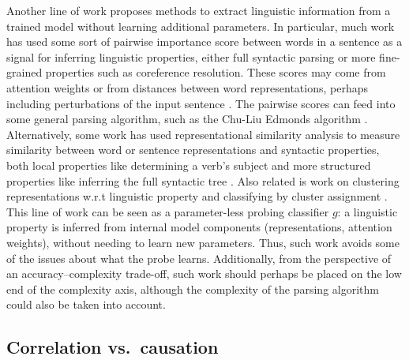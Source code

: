 \documentclass[discussion]{clv3}
\begin{document}
Another line of work proposes methods to extract linguistic information from a trained model without learning additional parameters. In particular, much work has used some sort of pairwise importance score between words in a sentence as a signal for inferring linguistic properties, either full syntactic parsing or more fine-grained properties such as coreference resolution. These scores may come from attention weights \cite{raganato-tiedemann-2018-analysis,clark-etal-2019-bert,marecek-rosa-2019-balustrades,htut2019attention} or from distances between word representations, perhaps including perturbations of the input sentence \cite{wu-etal-2020-perturbed}.   The pairwise scores can feed into some general parsing algorithm, such as the Chu-Liu Edmonds algorithm \citeyearpar{10030090917,edmonds1967optimum}.  Alternatively, some work has used representational similarity analysis \cite{10.3389/neuro.06.004.2008} to measure similarity between word or sentence representations and syntactic properties, both local properties like determining a verb's subject \cite{lepori-mccoy-2020-picking} and more structured properties like inferring the full syntactic tree \cite{chrupala-alishahi-2019-correlating}. Also related is work on clustering representations w.r.t linguistic property and classifying by cluster assignment \cite{zhou-srikumar-2021}.  
This line of work can be seen as a parameter-less probing classifier $g$: a linguistic property is inferred from internal model components (representations, attention weights), without needing to learn new parameters. Thus, such work avoids some of the issues about what the probe learns. Additionally, from the perspective of an accuracy--complexity trade-off, such work should perhaps be placed on the low end of the complexity axis, although the complexity of the parsing algorithm could also be taken into account.  


\subsection{Correlation vs.\ causation} \label{sec:causal}
\end{document}
